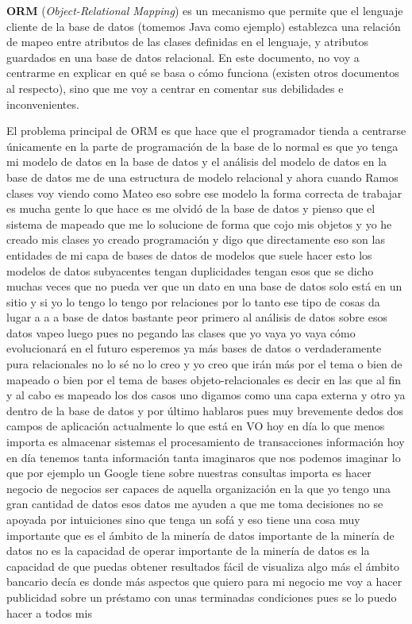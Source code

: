 \documentclass[12pt, a4paper]{article}
\title{\size{15pt}{Problemas de ORM} \vspace{-2ex}}
\date{\vspace{-5ex}}
\begin{document}
\maketitle
\thispagestyle{empty}

\vspace{-10ex}

\textbf{ORM} (\textit{Object-Relational Mapping}) es un mecanismo que permite que el lenguaje cliente de la base de datos (tomemos Java como ejemplo) establezca una relación de mapeo entre atributos de las clases definidas en el lenguaje, y atributos guardados en una base de datos relacional. En este documento, no voy a centrarme en explicar en qué se basa o cómo funciona (existen otros documentos al respecto), sino que me voy a centrar en comentar sus debilidades e inconvenientes.

El problema principal de ORM es que hace que el programador tienda a centrarse únicamente en la parte de programación de la base de  lo normal es que yo tenga mi modelo de datos en la base de datos y el análisis del modelo de datos en la base de datos me de una estructura de modelo relacional y ahora cuando Ramos clases voy viendo como Mateo eso sobre ese modelo la forma correcta de trabajar es mucha gente lo que hace es me olvidó de la base de datos y pienso que el sistema de mapeado que me lo solucione de forma que cojo mis objetos y yo he creado mis clases yo creado programación y digo que directamente eso son las entidades de mi capa de bases de datos de modelos que suele hacer esto los modelos de datos subyacentes tengan duplicidades tengan esos que se dicho muchas veces que no pueda ver que un dato en una base de datos solo está en un sitio y si yo lo tengo lo tengo por relaciones por lo tanto ese tipo de cosas da lugar a a a base de datos bastante peor primero al análisis de datos sobre esos datos vapeo luego pues no pegando las clases que yo vaya yo vaya cómo evolucionará en el futuro esperemos ya más bases de datos o verdaderamente pura relacionales no lo sé no lo creo y yo creo que irán más por el tema o bien de mapeado o bien por el tema de bases objeto-relacionales es decir en las que al fin y al cabo es mapeado los dos casos uno digamos como una capa externa y otro ya dentro de la base de datos y por último hablaros pues muy brevemente dedos dos campos de aplicación actualmente lo que está en VO hoy en día lo que menos importa es almacenar sistemas el procesamiento de transacciones información hoy en día tenemos tanta información tanta imaginaros que nos podemos imaginar lo que por ejemplo un Google tiene sobre nuestras consultas importa es hacer negocio de negocios ser capaces de aquella organización en la que yo tengo una gran cantidad de datos esos datos me ayuden a que me toma decisiones no se apoyada por intuiciones sino que tenga un sofá y eso tiene una cosa muy importante que es el ámbito de la minería de datos importante de la minería de datos no es la capacidad de operar importante de la minería de datos es la capacidad de que puedas obtener resultados fácil de visualiza algo más el ámbito bancario decía es donde más aspectos que quiero para mi negocio me voy a hacer publicidad sobre un préstamo con unas terminadas condiciones pues se lo puedo hacer a todos mis 
\end{document}
